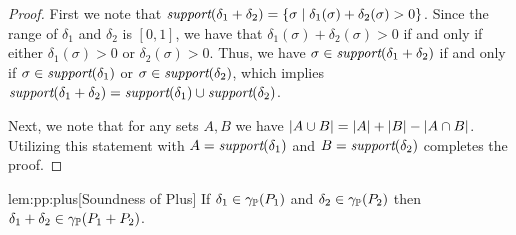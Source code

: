 \begin{proof}
  First we note that $\textit{support}(\delta_1 + \delta_2) = \{\sigma \mid
  \delta_1(\sigma) + \delta_2(\sigma) > 0\}$.  Since the range of
  $\delta_1$ and $\delta_2$ is $[0,1]$, we have that $\delta_1(\sigma)
  + \delta_2(\sigma) > 0$ if and only if either $\delta_1(\sigma) > 0$
  or $\delta_2(\sigma) > 0$.  Thus, we have $\sigma \in
  \textit{support}(\delta_1 + \delta_2)$ if and only if $\sigma \in
  \textit{support}(\delta_1)$ or $\sigma \in \textit{support}(\delta_2)$, which implies
  $\textit{support}(\delta_1 + \delta_2) = \textit{support}(\delta_1) \cup
  \textit{support}(\delta_2)$.

  Next, we note that for any sets $A,B$ we have $\left| A \cup B \right| =
  \left| A \right| + \left| B \right| - \left| A \cap B \right|$.  Utilizing this
  statement with $A = \textit{support}(\delta_1)$ and $B = \textit{support}(\delta_2)$
  completes the proof.
\end{proof}

\begin{replemma}{lem:pp:plus}[Soundness of Plus]
If $\delta_1 \in \gamma_{\mathbb{P}}(P_{1})$ and $\delta_2 \in \gamma_{\mathbb{P}}(P_{2})$ then $\delta_1 + \delta_2 \in \gamma_{\mathbb{P}}(P_{1} + P_{2})$.
\end{replemma}

